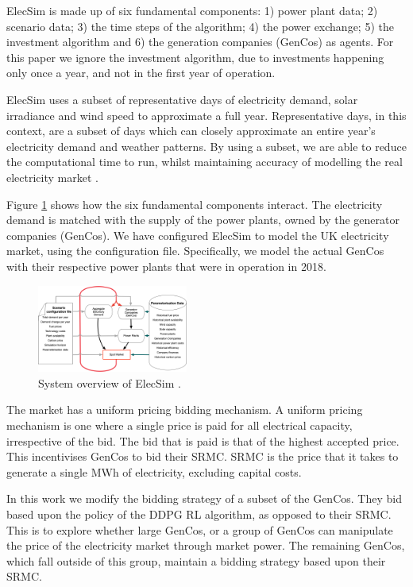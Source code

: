 ElecSim is made up of six fundamental components: 1) power plant data; 2) scenario data; 3) the time steps of the algorithm; 4) the power exchange; 5) the investment algorithm and 6) the generation companies (GenCos) as agents. For this paper we ignore the investment algorithm, due to investments happening only once a year, and not in the first year of operation. 

ElecSim uses a subset of representative days of electricity demand, solar irradiance and wind speed to approximate a full year. Representative days, in this context, are a subset of days which can closely approximate an entire year's electricity demand and weather patterns. By using a subset, we are able to reduce the computational time to run, whilst maintaining accuracy of modelling the real electricity market \cite{Kell2020}.

Figure \ref{fig:model_details} shows how the six fundamental components interact. The electricity demand is matched with the supply of the power plants, owned by the generator companies (GenCos). We have configured ElecSim to model the UK electricity market, using the configuration file. Specifically, we model the actual GenCos with their respective power plants that were in operation in 2018.



\begin{figure}
	\includegraphics[width=0.44\textwidth]{figures/methedology/system-overview-v2}
	\caption{System overview of ElecSim \cite{Kell}.}
	\label{fig:model_details}
\end{figure}

The market has a uniform pricing bidding mechanism. A uniform pricing mechanism is one where a single price is paid for all electrical capacity, irrespective of the bid. The bid that is paid is that of the highest accepted price. This incentivises GenCos to bid their SRMC. SRMC is the price that it takes to generate a single MWh of electricity, excluding capital costs. 

In this work we modify the bidding strategy of a subset of the GenCos. They bid based upon the policy of the DDPG RL algorithm, as opposed to their SRMC. This is to explore whether large GenCos, or a group of GenCos can manipulate the price of the electricity market through market power. The remaining GenCos, which fall outside of this group, maintain a bidding strategy based upon their SRMC.

